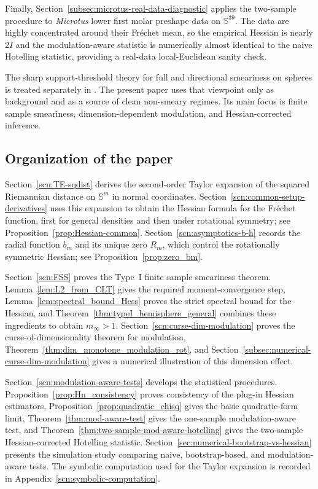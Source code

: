 \documentclass{amsart}
\theoremstyle{definition}
\theoremstyle{remark}
\newcommand\0{\boldsymbol{0}}
\begin{document}
Finally, Section~\ref{subsec:microtus-real-data-diagnostic} applies the two-sample procedure to
\textit{Microtus} lower first molar preshape data on \(\mathbb S^{39}\).  The data are highly
concentrated around their Fr\'echet mean, so the empirical Hessian is nearly \(2I\) and the
modulation-aware statistic is numerically almost identical to the naive Hotelling statistic,
providing a real-data local-Euclidean sanity check.

The sharp support-threshold theory for full and directional smeariness on spheres is treated separately in \citet{Pal2026SharpSupportThresholds}.  The present paper uses that viewpoint only as background and as a source of clean non-smeary regimes.  Its main focus is finite sample smeariness, dimension-dependent modulation, and Hessian-corrected inference.

\subsection{Organization of the paper}
\label{subsec:intro-organization}

Section~\ref{scn:TE-sqdist} derives the second-order Taylor expansion of the squared Riemannian distance on \(\mathbb S^m\) in normal coordinates.  Section~\ref{scn:common-setup-derivatives} uses this expansion to obtain the Hessian formula for the Fr\'echet function, first for general densities and then under rotational symmetry; see Proposition~\ref{prop:Hessian-common}.  Section~\ref{scn:asymptotics-b-h} records the radial function \(b_m\) and its unique zero \(R_m\), which control the rotationally symmetric Hessian; see Proposition~\ref{prop:zero_bm}.

Section~\ref{scn:FSS} proves the Type~I finite sample smeariness theorem.  Lemma~\ref{lem:L2_from_CLT} gives the required moment-convergence step, Lemma~\ref{lem:spectral_bound_Hess} proves the strict spectral bound for the Hessian, and Theorem~\ref{thm:typeI_hemisphere_general} combines these ingredients to obtain \(m_\infty>1\).  Section~\ref{scn:curse-dim-modulation} proves the curse-of-dimensionality theorem for modulation, Theorem~\ref{thm:dim_monotone_modulation_rot}, and Section~\ref{subsec:numerical-curse-dim-modulation} gives a numerical illustration of this dimension effect.

Section~\ref{scn:modulation-aware-tests} develops the statistical procedures.  Proposition~\ref{prop:Hn_consistency} proves consistency of the plug-in Hessian estimators, Proposition~\ref{prop:quadratic_chisq} gives the basic quadratic-form limit, Theorem~\ref{thm:mod-aware-test} gives the one-sample modulation-aware test, and Theorem~\ref{thm:two-sample-mod-aware-hotelling} gives the two-sample Hessian-corrected Hotelling statistic.  Section~\ref{sec:numerical-bootstrap-vs-hessian} presents the simulation study comparing naive, bootstrap-based, and modulation-aware tests.  The symbolic computation used for the Taylor expansion is recorded in Appendix~\ref{scn:symbolic-computation}.
\end{document}
